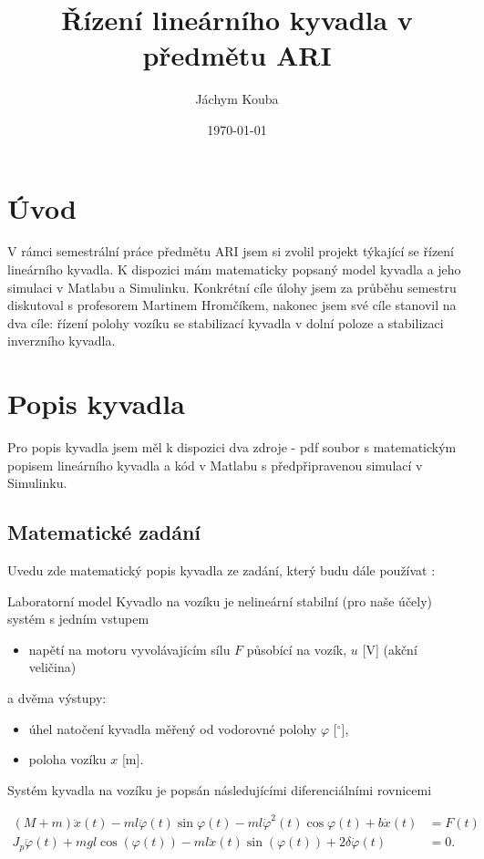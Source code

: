 \documentclass[12pt]{article}
\title{Řízení lineárního kyvadla v předmětu ARI}
\author{Jáchym Kouba}
\date{\today}
\begin{document}
\maketitle
\newpage

\FloatBarrier
\section{Úvod}
V rámci semestrální práce předmětu ARI jsem si zvolil projekt týkající se řízení
lineárního kyvadla. K dispozici mám matematicky popsaný model kyvadla a jeho
simulaci v Matlabu a Simulinku. Konkrétní cíle úlohy jsem za průběhu semestru
diskutoval s profesorem Martinem Hromčíkem, nakonec jsem své cíle stanovil na
dva cíle: řízení polohy vozíku se stabilizací kyvadla v dolní poloze a
stabilizaci inverzního kyvadla.

\FloatBarrier
\section{Popis kyvadla}
Pro popis kyvadla jsem měl k dispozici dva zdroje - pdf soubor s matematickým
popisem lineárního kyvadla a kód v Matlabu s předpřipravenou simulací v
Simulinku.

\subsection{Matematické zadání}
Uvedu zde matematický popis kyvadla ze zadání, který budu dále používat \cite{zadani}:

Laboratorní model Kyvadlo na vozíku je nelineární stabilní (pro naše účely) systém 
s jedním vstupem

\begin{itemize}
  \item napětí na motoru vyvolávajícím sílu $F$ působící na vozík, $u$ [V]
    (akční veličina)
\end{itemize}
a dvěma výstupy:
\begin{itemize}
  \item úhel natočení kyvadla měřený od vodorovné polohy $\varphi$ [$^\circ$],
  \item poloha vozíku $x$ [m].
\end{itemize}

Systém kyvadla na vozíku je popsán následujícími diferenciálními
rovnicemi

\begin{align*}
(M + m)\ddot{x}(t) - ml\ddot{\varphi}(t) \sin \varphi(t) - ml\dot{\varphi}^2(t) \cos \varphi(t) + b\dot{x}(t) &= F(t) \\
J_p \ddot{\varphi}(t) + mgl\cos(\varphi(t)) - ml\ddot{x}(t)\sin(\varphi(t)) + 2\delta\dot{\varphi}(t) &= 0.
\end{align*}
\end{document}
